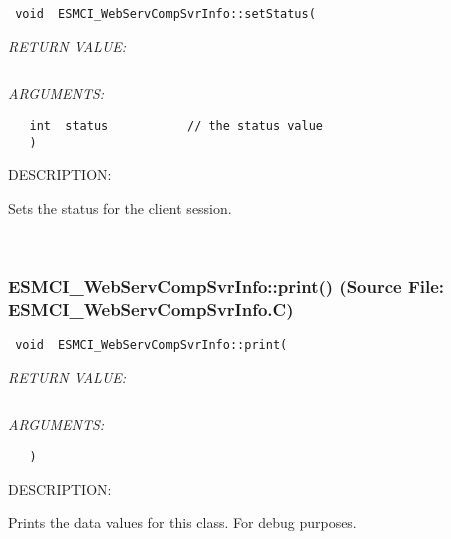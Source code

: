   
\begin{verbatim} void  ESMCI_WebServCompSvrInfo::setStatus(\end{verbatim}{\em RETURN VALUE:}
\begin{verbatim} \end{verbatim}{\em ARGUMENTS:}
\begin{verbatim}   int  status           // the status value
   )\end{verbatim}
{\sf DESCRIPTION:\\ }


      Sets the status for the client session.
   
 
\mbox{}\hrulefill\
 
\subsubsection{ESMCI\_WebServCompSvrInfo::print() (Source File: ESMCI\_WebServCompSvrInfo.C)}


  
\begin{verbatim} void  ESMCI_WebServCompSvrInfo::print(\end{verbatim}{\em RETURN VALUE:}
\begin{verbatim} \end{verbatim}{\em ARGUMENTS:}
\begin{verbatim}   )\end{verbatim}
{\sf DESCRIPTION:\\ }


      Prints the data values for this class.  For debug purposes.
  
\setlength{\parskip}{\oldparskip}
\setlength{\parindent}{\oldparindent}
\setlength{\baselineskip}{\oldbaselineskip}
